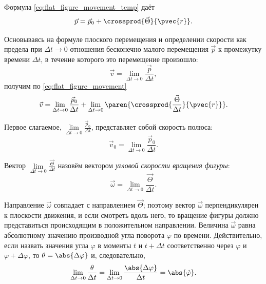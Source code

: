 Формула \ref{eq:flat_figure_movement_temp} даёт
\begin{equation}
  \label{eq:flat_figure_movement}
  \vec{p} = \vec{p}_0 + \crossprod{\vec{\Theta}}{\pvec{r}}.
\end{equation}

Основываясь на формуле плоского перемещения и определении скорости как предела
при $\Delta t \to 0$ отношения бесконечно малого перемещения $\vec{p}$ к
промежутку времени $\Delta t$, в течение которого это перемещение произошло:
\begin{equation*}
  \vec{v} = \lim_{\Delta t \to 0} \frac{\vec{p}}{\Delta t},
\end{equation*}
получим по \ref{eq:flat_figure_movement}
\begin{equation}
  \label{eq:figure_velocity_temp}
  \vec{v} = \lim_{\Delta t \to 0} \frac{\vec{p}_0}{\Delta t} +
    \lim_{\Delta t \to 0} \paren{\crossprod{\frac{\vec{\Theta}}{\Delta t}}
    {\pvec{r}}}.
\end{equation}

Первое слагаемое, $\lim\limits_{\Delta t \to 0} \frac{\vec{p}_0}{\Delta t}$,
представляет собой скорость полюса:
\begin{equation}
  \label{eq:figure_pole_velocity}
  \vec{v}_0 = \lim_{\Delta t \to 0} \frac{\vec{p}_0}{\Delta t}.
\end{equation}

Вектор $\lim\limits_{\Delta t \to 0} \frac{\vec{\Theta}}{\Delta t}$ назовём
вектором \textit{угловой скорости вращения фигуры}:
\begin{equation}
  \label{eq:figure_angular_velocity}
  \vec{\omega} = \lim_{\Delta t \to 0} \frac{\vec{\Theta}}{\Delta t}.
\end{equation}

Направление $\vec{\omega}$ совпадает с направлением $\vec{\Theta}$; поэтому
вектор $\vec{\omega}$ перпендикулярен к плоскости движения, и если смотреть
вдоль него, то вращение фигуры должно представиться происходящим в положительном
направлении. Величина $\vec{\omega}$ равна абсолютному значению производной угла
поворота $\varphi$ по времени. Действительно, если назвать значения угла
$\varphi$ в моменты $t$ и $t + \Delta t$ соответственно через $\varphi$ и
$\varphi + \Delta \varphi$, то $\theta = \abs{\Delta \varphi}$ и, следовательно,
\begin{equation*}
  \lim_{\Delta t \to 0} \frac{\theta}{\Delta t} = \lim_{\Delta t \to 0}
  \frac{\abs{\Delta \varphi}}{\Delta t} = \abs{\dot{\varphi}}.
\end{equation*}

